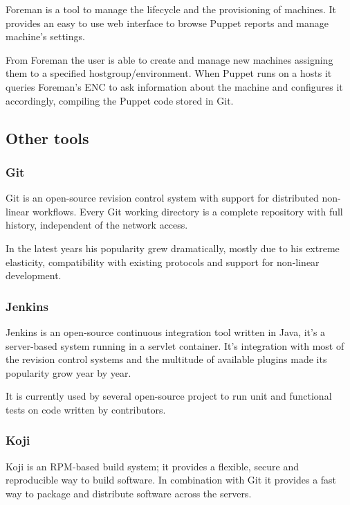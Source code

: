 Foreman is a tool to manage the lifecycle and the provisioning of
machines. It provides an easy to use web interface to browse Puppet
reports and manage machine's settings.

From Foreman the user is able to create and manage new machines assigning
them to a specified hostgroup/environment. When Puppet runs on a hosts it
queries Foreman's ENC to ask information about the machine and configures
it accordingly, compiling the Puppet code stored in Git.

\subsection{Other tools}

\subsubsection{Git}

Git is an open-source revision control system with support for distributed
non-linear workflows. Every Git working directory is a complete repository
with full history, independent of the network access.

In the latest years his popularity grew dramatically, mostly due to his
extreme elasticity, compatibility with existing protocols and support for
non-linear development.

\subsubsection{Jenkins}

Jenkins is an open-source continuous integration tool written in Java,
it's a server-based system running in a servlet container. It's
integration with most of the revision control systems and the multitude of
available plugins made its popularity grow year by year.

It is currently used by several open-source project to run unit and
functional tests on code written by contributors.

\subsubsection{Koji}

Koji is an RPM-based build system; it provides a flexible, secure and
reproducible way to build software. In combination with Git it provides
a fast way to package and distribute software across the servers.

